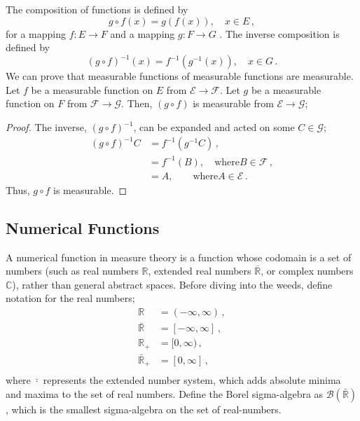The composition of functions is defined by 
\begin{equation}
	g\circ f (x) = g(f(x)), \quad x \in  E\,,
\end{equation}
for a mapping $f: E\rightarrow F$ and a mapping $g: F\rightarrow G$
. The inverse composition is defined by
\begin{equation}
	(g\circ f)^{-1} (x) = f^{-1}(g^{-1}(x)), \quad x \in  G\,.
\end{equation}
We can prove that measurable functions of measurable functions are measurable. Let $f$ be a measurable function on $E$ from $\mathcal{E} \rightarrow \mathcal{F}$. Let $g$ be a measurable function on $F$ from $\mathcal{F} \rightarrow \mathcal{G}$. Then, $(g\circ f)$ is measurable from $\mathcal{E} \rightarrow \mathcal{G}$;
\begin{proof}
	The inverse, $(g\circ f)^{-1}$, can be expanded and acted on some $C\in \mathcal{G}$;
	\begin{align*}
		(g\circ f)^{-1}C &= f^{-1}(g^{-1}C)\,,\\
		&= f^{-1}(B), \quad \mathrm{where} B \in \mathcal{F}\,,\\
		&= A, \quad \quad \mathrm{    where }A \in \mathcal{E}\,.
	\end{align*}
	Thus, $g\circ f$ is measurable.
\end{proof}

\subsection{Numerical Functions}

A numerical function in measure theory is a function whose codomain is a set of numbers (such as real numbers \(\mathbb{R}\), extended real numbers \(\overline{\mathbb{R}}\), or complex numbers \(\mathbb{C}\)), rather than general abstract spaces. Before diving into the weeds, define notation for the real numbers;
\begin{align*}
	\mathbb{R} &= (-\infty, \infty)\,,\\
	\bar{\mathbb{R}} &= [-\infty, \infty]\,,\\
	\mathbb{R}_+ &= [0, \infty)\,,\\
	\bar{\mathbb{R}}_+ &= [0, \infty]\,,\\
\end{align*}
where $\bar{\cdot}$ represents the extended number system, which adds absolute minima and maxima to the set of real numbers. Define the Borel sigma-algebra as $\mathcal{B}(\bar{\mathbb{R}})$, which is the smallest sigma-algebra on the set of real-numbers.


